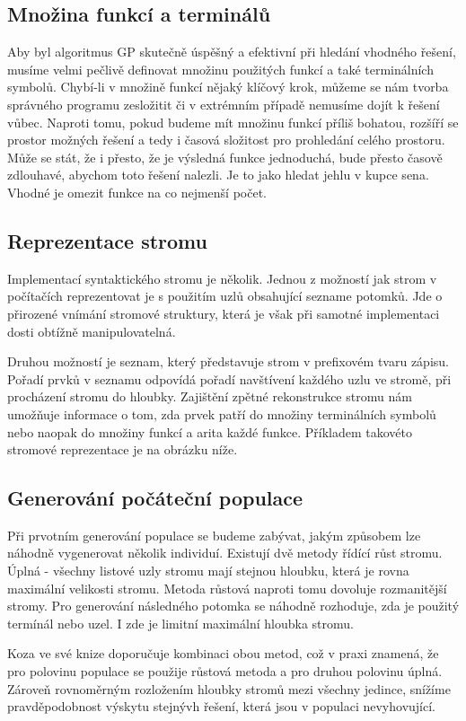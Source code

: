 \documentclass[bc,male,java,dept460]{diploma}		%
\begin{document}
\subsection{Množina funkcí a terminálů}
Aby byl algoritmus GP skutečně úspěšný a efektivní při hledání vhodného řešení, musíme velmi pečlivě definovat množinu použitých funkcí a také terminálních symbolů. Chybí-li v množině funkcí nějaký klíčový krok, můžeme se nám tvorba správného programu zesložitit či v extrémním případě nemusíme dojít k řešení vůbec. Naproti tomu, pokud budeme mít množinu funkcí příliš bohatou, rozšíří se prostor možných řešení a tedy i časová složitost pro prohledání celého prostoru. Může se stát, že i přesto, že je výsledná funkce jednoduchá, bude přesto časově zdlouhavé, abychom toto řešení nalezli. Je to jako hledat jehlu v kupce sena. Vhodné je omezit funkce na co nejmenší počet.

\subsection{Reprezentace stromu}
Implementací syntaktického stromu je několik. Jednou z možností jak strom v počítačích reprezentovat je s použitím uzlů obsahující sezname potomků. Jde o přirozené vnímání stromové struktury, která je však při samotné implementaci dosti obtížně manipulovatelná. 

Druhou možností je seznam, který představuje strom v prefixovém tvaru zápisu. Pořadí prvků v seznamu odpovídá pořadí navštívení každého uzlu ve stromě, při procházení stromu do hloubky. Zajištění zpětné rekonstrukce stromu nám umožňuje informace o tom, zda prvek patří do množiny terminálních symbolů nebo naopak do množiny funkcí a arita každé funkce. Příkladem takovéto stromové reprezentace je na obrázku níže.

\subsection{Generování počáteční populace}
Při prvotním generování populace se budeme zabývat, jakým způsobem lze náhodně vygenerovat několik individuí. Existují dvě metody řídící růst stromu. Úplná - všechny listové uzly stromu mají stejnou hloubku, která je rovna maximální velikosti stromu. Metoda růstová naproti tomu dovoluje rozmanitější stromy. Pro generování následného potomka se náhodně rozhoduje, zda je použitý termínál nebo uzel. I zde je limitní maximální hloubka stromu.

Koza ve své knize \cite{kozagp} doporučuje kombinaci obou metod, což v praxi znamená, že pro polovinu populace se použije růstová metoda a pro druhou polovinu úplná. Zároveň rovnoměrným rozložením hloubky stromů mezi všechny jedince, snížíme pravděpodobnost výskytu stejnývh řešení, která jsou v populaci nevyhovující. 
\end{document}
